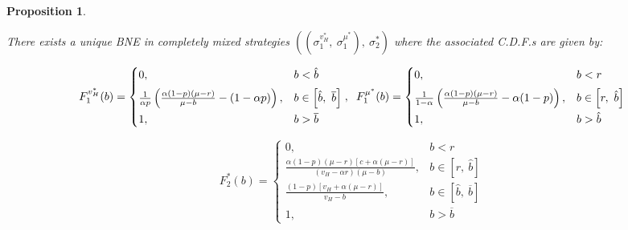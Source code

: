 \documentclass[11pt]{article}
\theoremstyle{plain}
\theoremstyle{definition}
\theoremstyle{plain}
\theoremstyle{plain}
\theoremstyle{plain}
\theoremstyle{plain}
\newtheorem{prop}[thm]{Proposition}
\numberwithin{equation}{section}
\begin{document}
\begin{prop}\label{mixed-BNE-main}

There exists a unique BNE in completely mixed strategies $ \left( \left( \sigma_1^{v_H^*},\ \sigma_1^{\mu^{*}} \right), \ \sigma_2^* \right) $ where the associated C.D.F.s are given by:

\vspace{0.2cm}

{\footnotesize
\begin{equation*}
 F_1^{v_H^*}(b) = \begin{cases}
     0, & b < \hat{b} \\[5pt]
     \frac{1}{\alpha p} \left( \frac{\alpha (1 - p)(\mu - r)}{\mu - b} - (1 - \alpha p) \right), & b \in \left[ \hat{b},\ \overline{b} \right] \\[5pt]
     1, & b > \overline{b}
 \end{cases}, \hspace{0.2cm} F_1^{\mu^*}(b) = \begin{cases}
     0, & b < r \\[5pt]
     \frac{1}{1 - \alpha} \left( \frac{\alpha (1 - p)(\mu - r)}{\mu - b} - \alpha (1 - p) \right), & b \in \left[ r,\ \hat{b} \right] \\[5pt]
     1, & b > \hat{b}
 \end{cases}    
\end{equation*}
}

\vspace{0.5cm}

\begin{small}
\begin{equation*}
 F_2^*(b) = \begin{cases}
        0, & b < r \\[5pt]
        \frac{\alpha (1 - p) (\mu - r) \left[ c +\alpha (\mu - r) \right]}{(v_H - \alpha r)(\mu - b)}, &  b \in \left[ r, \ \hat{b} \right] \\[5pt]
        \frac{(1 - p)[v_H + \alpha (\mu - r)]}{v_H - b},  & b \in \left[ \hat{b}, \ \overline{b} \right] \\[5pt]
        1, & b > \overline{b}
    \end{cases}   
\end{equation*}
\end{small}
 
\end{prop}

\vspace{0.5cm}
\end{document}
